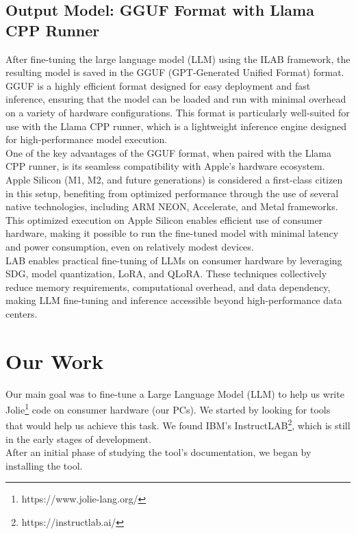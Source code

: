 \documentclass[12pt]{article}
\begin{document}
\subsection{Output Model: GGUF Format with Llama CPP Runner}\label{gguf}
After fine-tuning the large language model (LLM) using the ILAB framework, the resulting model is saved in the GGUF (GPT-Generated Unified Format) format.\\
GGUF is a highly efficient format designed for easy deployment and fast inference, ensuring that the model can be loaded and run with minimal overhead on a variety of hardware configurations. This format is particularly well-suited for use with the Llama CPP runner, which is a lightweight inference engine designed for high-performance model execution.\\
One of the key advantages of the GGUF format, when paired with the Llama CPP runner, is its seamless compatibility with Apple's hardware ecosystem. Apple Silicon (M1, M2, and future generations) is considered a first-class citizen in this setup, benefiting from optimized performance through the use of several native technologies, including ARM NEON, Accelerate, and Metal frameworks.\\
This optimized execution on Apple Silicon enables efficient use of consumer hardware, making it possible to run the fine-tuned model with minimal latency and power consumption, even on relatively modest devices.\vspace{14pt}\\
LAB enables practical fine-tuning of LLMs on consumer hardware by leveraging SDG, model quantization, LoRA, and QLoRA. These techniques collectively reduce memory requirements, computational overhead, and data dependency, making LLM fine-tuning and inference accessible beyond high-performance data centers.

\section{Our Work}
Our main goal was to fine-tune a Large Language Model (LLM) to help us write Jolie\footnote{https://www.jolie-lang.org/} code on consumer hardware (our PCs). We started by looking for tools that would help us achieve this task. We found IBM's InstructLAB\footnote{https://instructlab.ai/}, which is still in the early stages of development.\vspace{14pt}\\
After an initial phase of studying the tool's documentation, we began by installing the tool.
\end{document}

